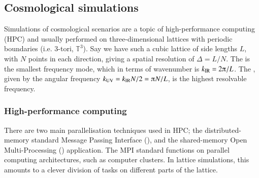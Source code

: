     




\subsection{Cosmological simulations}

    Simulations of cosmological scenarios are a topic of high-performance computing (HPC) and usually performed on three-dimensional lattices with periodic boundaries (i.e.  3-tori, $\mathbb{T}^3$). Say we have such a cubic lattice of side lengths $L$, with $N$ points in each direction, giving a spatial resolution of $\Delta=L/N$. %
    The  is the smallest frequency mode, which in terms of wavenumber is $k\ped{IR}=2\ppi/L$. %
    The , given by the angular frequency $k\ped{UV}=k\ped{IR} N/2 = \ppi N/L$, is the highest resolvable frequency.


    \subsubsection{High-performance computing}

    There are two main parallelisation techniques used in HPC; the distributed-memory standard Message Passing Interface (), and the shared-memory Open Multi-Processing () application. %
    The MPI standard functions on parallel computing architectures, such as computer clusters. In lattice simulations, this amounts to a clever division of tasks on different parts of the lattice. %


    

    

    
    

